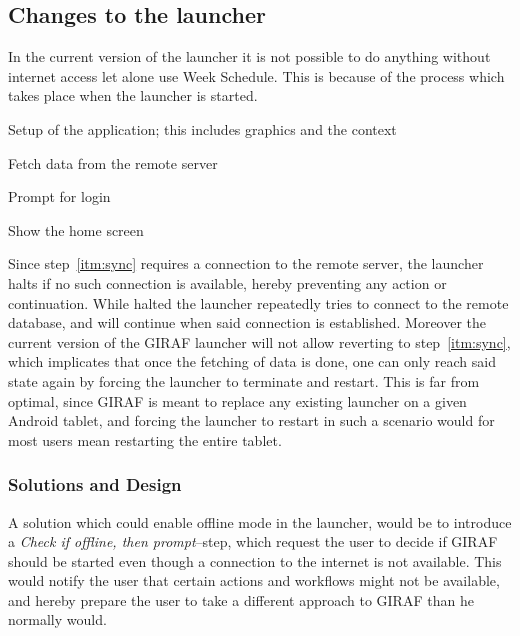 \subsection{Changes to the launcher}
\label{sub:changes_to_the_launcher}
In the current version of the launcher it is not possible to do anything without internet access let alone use Week Schedule.
This is because of the process which takes place when the launcher is started.
\begin{enumberate}
    \item Setup of the application; this includes graphics and the context
    \item\label{itm:sync} Fetch data from the remote server
    \item Prompt for login
    \item Show the home screen
\end{enumberate}
Since step~\ref{itm:sync} requires a connection to the remote server, the launcher halts if no such connection is available, hereby preventing any action or continuation.
While halted the launcher repeatedly tries to connect to the remote database, and will continue when said connection is established.
Moreover the current version of the GIRAF launcher will not allow reverting to step~\ref{itm:sync}, which implicates that once the fetching of data is done, one can only reach said state again by forcing the launcher to terminate and restart.
This is far from optimal, since GIRAF is meant to replace any existing launcher on a given Android tablet, and forcing the launcher to restart in such a scenario would for most users mean restarting the entire tablet.

\subsubsection{Solutions and Design}
A solution which could enable offline mode in the launcher, would be to introduce a \textit{Check if offline, then prompt}--step, which request the user to decide if GIRAF should be started even though a connection to the internet is not available.
This would notify the user that certain actions and workflows might not be available, and hereby prepare the user to take a different approach to GIRAF than he normally would.

